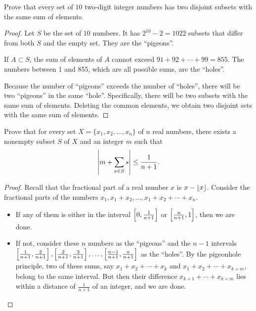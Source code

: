 \begin{example}[IMO 1972]
Prove that every set of $10$ two-digit integer numbers has two disjoint subsets with the same sum of elements.

\begin{proof}
Let $S$ be the set of $10$ numbers. It has $2^{10}-2=1022$ subsets that differ from both $S$ and the empty set. They are the ``pigeons''.

If $A\subset S$, the sum of elements of $A$ cannot exceed $91+92+\cdots+99=855$. The numbers between 1 and 855, which are all possible sums, are the ``holes''.

Because the number of ``pigeons'' exceeds the number of ``holes'', there will be two ``pigeons'' in the same ``hole''. Specifically, there will be two subsets with the same sum of elements. Deleting the common elements, we obtain two disjoint sets with the same sum of elements.
\end{proof}
\end{example}

\begin{example}[Putnam 2006]
Prove that for every set $X=\{x_1,x_2,\dots,x_n\}$ of $n$ real numbers, there exists a nonempty subset $S$ of $X$ and an integer $m$ such that
\[\left|m+\sum_{x\in S}s\right|\le\frac{1}{n+1}.\]

\begin{proof}
Recall that the fractional part of a real number $x$ is $x-\left\lfloor x \right\rfloor$. Consider the fractional parts of the numbers $x_1,x_1+x_2,\dots,x_1+x_2+\cdots+x_n$.
\begin{itemize}
\item If any of them is either in the interval $\left[0,\frac{1}{n+1}\right]$ or $\left[\frac{n}{n+1},1\right]$, then we are done.
\item If not, consider these $n$ numbers as the ``pigeons'' and the $n-1$ intervals $\left[\frac{1}{n+1},\frac{2}{n+1}\right],\left[\frac{2}{n+1},\frac{3}{n+1}\right],\dots,\left[\frac{n-1}{n+1},\frac{n}{n+1}\right]$ as the ``holes''. By the pigeonhole principle, two of these sums, say $x_1+x_2+\cdots+x_k$ and $x_1+x_2+\cdots+x_{k+m}$, belong to the same interval. But then their difference $x_{k+1}+\cdots+x_{k+m}$ lies within a distance of $\frac{1}{n+1}$ of an integer, and we are done.

\end{itemize}
\end{proof}
\end{example}


\pagebreak

